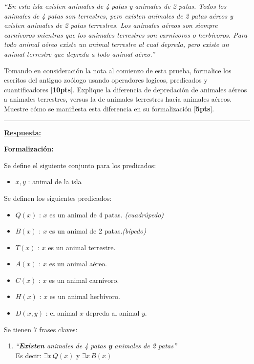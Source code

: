 \documentclass[legalpaper,10pt]{article}
\begin{document}
\begin{enumerate}[a)]
\emph{``En esta isla existen animales de 4 patas y animales de 2 patas. Todos los animales de 4 patas son terrestres, pero existen animales de 2 patas aéreos y existen animales de 2 patas terrestres. Los animales aéreos son siempre carnívoros mientras que los animales terrestres son carnívoros o herbívoros. Para todo animal aéreo existe un animal terrestre al cual depreda, pero existe un animal terrestre que depreda a todo animal aéreo.''}

Tomando en consideración la nota al comienzo de esta prueba, formalice los escritos del antiguo zoólogo usando operadores logicos, predicados y cuantificadores [\textbf{10pts}]. Explique la diferencia de depredación de animales aéreos a animales terrestres, versus la de animales terrestres hacia animales aéreos. Muestre cómo se manifiesta esta diferencia en su formalización [\textbf{5pts}].

\rule{5cm}{0.4pt}

\underline{\textbf{Respuesta:}}

\textbf{Formalización:}

Se define el siguiente conjunto para los predicados:
\begin{itemize}
  \item \(x, y\) : animal de la isla
\end{itemize}

Se definen los siguientes predicados:

\begin{itemize}
  \item \(Q(x)\) : \(x\) es un animal de 4 patas. \textit{(cuadrúpedo)}
  \item \(B(x)\) : \(x\) es un animal de 2 patas.\textit{(bípedo)}
  \item \(T(x)\) : \(x\) es un animal terrestre.
  \item \(A(x)\) : \(x\) es un animal aéreo.
  \item \(C(x)\) : \(x\) es un animal carnívoro.
  \item \(H(x)\) : \(x\) es un animal herbívoro.
  \item \(D(x, y)\) : el animal \(x\) depreda al animal \(y\).
\end{itemize}

Se tienen 7 frases claves:

\begin{enumerate}[1)]
  \item \textit{``\textbf{Existen} animales de 4 patas \textbf{y} animales de 2 patas''} \\ Es decir: \(\boxed{\exists x \, Q(x)}\) y \(\boxed{\exists x \, B(x)}\)


\end{enumerate}
\end{enumerate}
\end{document}
